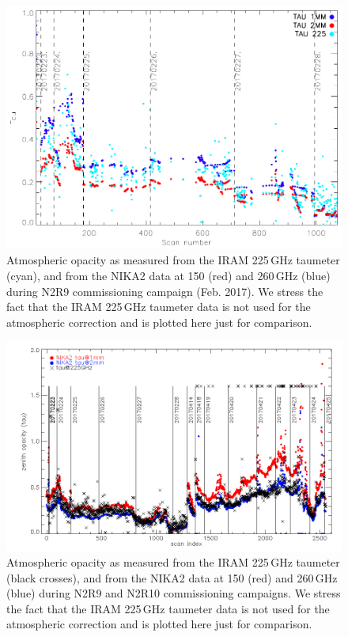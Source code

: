 

\begin{figure}[ht]
\begin{center}
\includegraphics[scale=0.8]{../../Paper_NIKA2_Technical/opacity_evol_run22.pdf}
\caption{Atmospheric opacity as measured from the IRAM 225\,GHz taumeter
(cyan), and from the NIKA2 data at 150 (red) and 260\,GHz (blue) during N2R9
commissioning campaign (Feb. 2017). We stress the fact that the IRAM 225\,GHz
taumeter data is not used for the atmospheric correction and is plotted here
just for comparison.
  \label{fig:taumeas_paper}}
\end{center}
\end{figure}


\begin{figure}[ht]
\begin{center}
\includegraphics[width=\linewidth]{Figures/opacity_vs_index_N2R9_N2R10.png}
\caption{Atmospheric opacity as measured from the IRAM 225\,GHz
  taumeter (black crosses), and from the NIKA2 data at 150 (red) and 260\,GHz (blue) during 
  N2R9 and N2R10 commissioning campaigns.  We stress the fact that the IRAM 225\,GHz taumeter data is not used for the atmospheric correction and is plotted here just for comparison.
  \label{fig:taumeas}}
\end{center}
\end{figure}


